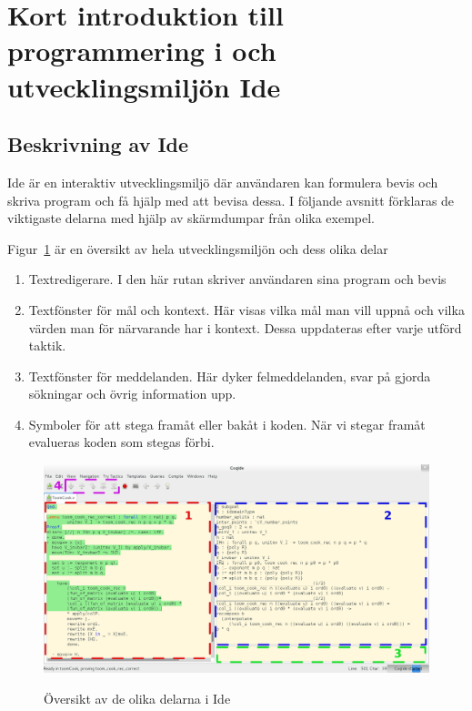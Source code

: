 \section{Kort introduktion till programmering i \coq{} och utvecklingsmiljön
\coq{} Ide}

\subsection{Beskrivning av \coq{} Ide}


\coq Ide är en interaktiv utvecklingsmiljö där användaren kan
formulera bevis och skriva program och få hjälp med att bevisa
dessa. I följande avsnitt förklaras de viktigaste delarna med
hjälp av skärmdumpar från olika exempel.


Figur~\ref{fig:oversikt} är en översikt av hela utvecklingsmiljön och dess olika delar
\begin{enumerate}
\item Textredigerare. I den här rutan skriver användaren sina program och bevis
\item Textfönster för mål och kontext. Här visas vilka mål man vill uppnå och
  vilka värden man för närvarande har i kontext. Dessa uppdateras efter varje
  utförd taktik.
\item Textfönster för meddelanden. Här dyker felmeddelanden, svar på
  gjorda sökningar och övrig information upp.
\item Symboler för att stega framåt eller bakåt i koden. När vi stegar framåt
  evalueras koden som stegas förbi.
\end{enumerate}

\filbreak

\begin{figure}[H]
  \centering
  \includegraphics[width=\textwidth]{images/Overview}
  \label{fig:oversikt}
  \caption[Översikt av \coq{} Ide]
   {Översikt av de olika delarna i \coq{} Ide}
\end{figure}

